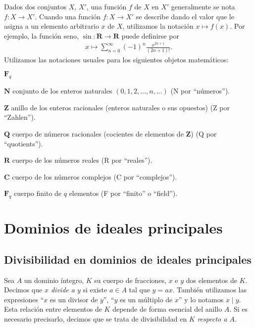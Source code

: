 \documentclass[10pt,oneside,bibtotoc,smallheadings,leqno,a5paper,DIV=12]{scrbook}
\newcommand{\RR}{\mathbf{R}}
\newcommand{\QQ}{\mathbf{Q}}
\newcommand{\ZZ}{\mathbf{Z}}
\newcommand{\NN}{\mathbf{N}}
\newcommand{\FF}{\mathbf{F}}
\newcommand{\CC}{\mathbf{C}}
\renewcommand{\to}[1][]{\xrightarrow{#1}}
\numberwithin{equation}{section}
\theoremstyle{defi}
\theoremstyle{enonce}
\theoremstyle{rem}
\numberwithin{theorem}{section}
\numberwithin{proposition}{section}
\numberwithin{definition}{section}
\numberwithin{lemma}{section}
\numberwithin{corollary}{section}
\numberwithin{example}{section}
\numberwithin{footnote}{section}%
\begin{document}
Dados dos conjuntos $X$, $X'$, una funci\'on $f$ de $X$ en $X'$ generalmente se nota
$f:X\to X'$. Cuando una funci\'on $f:X\to X'$ se describe dando el valor que
le asigna a un elemento arbitrario $x$ de $X$, utilizamos la notaci\'on $x\mapsto f(x)$.
Por ejemplo, la funci\'on seno, $\sin:\RR\to\RR$ puede definirse por
\begin{gather*}
x\mapsto\sum_{n=0}^{\infty}(-1)^{n}\frac{x^{2n+1}}{(2n+1)!}.
\end{gather*}
Utilizamos las notaciones usuales para los siguientes objetos matem\'aticos:
\begin{labeling}[:]{$\FF_{q}$}
\item[$\NN$] conjunto de los enteros naturales $(0,1,2,\dots,n,\dots)$ (N por ``n\'umeros'').
\item[$\ZZ$] anillo de los enteros racionales (enteros naturales o sus opuestos)
(Z por ``Zahlen'').
\item[$\QQ$] cuerpo de n\'umeros racionales (cocientes de elementos de $\ZZ$) (Q por
``quotients'').
\item[$\RR$] cuerpo de los n\'umeros reales (R por ``reales'').
\item[$\CC$] cuerpo de los n\'umeros complejos (C por ``complejos'').
\item[$\FF_{q}$] cuerpo finito de $q$ elementos (F por ``finito'' o ``field'').
\end{labeling}

\mainmatter

\chapter{Dominios de ideales principales}\label{cap1}

\section{Divisibilidad en dominios de ideales principales}\label{sec1.1}

Sea $A$ un dominio \'integro, $K$ su cuerpo de fracciones, $x$ e $y$ dos elementos de $K$.
Decimos que \emph{$x$ divide a $y$} si existe $a\in A$ tal que $y = ax$. Tambi\'en utilizamos
las expresiones ``$x$ es un divisor de $y$'', ``$y$ es un m\'ultiplo de $x$'' y lo notamos $x\mid y$.
Esta relaci\'on entre elementos de $K$ depende de forma esencial del anillo $A$. Si es necesario
precisarlo, decimos que se trata de divisibilidad en $K$ \emph{respecto a $A$.}
\end{document}

